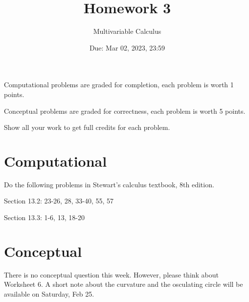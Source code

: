 \documentclass[12pt]{article}
\title{Homework 3}
\author{ Multivariable Calculus}
\date{Due: Mar 02, 2023, 23:59}
\theoremstyle{definition}
\begin{document}
\maketitle

Computational problems are graded for completion, each problem is worth 1 points.

Conceptual problems are graded for correctness, each problem is worth 5 points.

Show all your work to get full credits for each problem.
\section{Computational}
Do the following problems in Stewart's calculus textbook, 8th edition.

Section 13.2: 23-26, 28, 33-40, 55, 57

Section 13.3: 1-6, 13, 18-20 

\section{Conceptual}

There is no conceptual question this week. However, please think
about Worksheet 6.  A short note about the curvature 
and the osculating circle will be available on Saturday, Feb 25.

%
\end{document}
